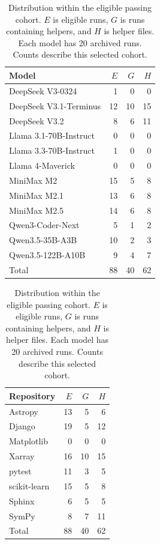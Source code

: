 \documentclass[10pt,conference]{IEEEtran}
\begin{document}
\begin{table}[t]
\centering
\caption{Distribution within the eligible passing cohort. $E$ is eligible runs, $G$ is runs containing helpers, and $H$ is helper files. Each model has 20 archived runs. Counts describe this selected cohort.}
\label{tab:population}
\begin{minipage}[t]{0.49\textwidth}
\centering
\begin{tabular}[t]{@{}lrrr@{}}
\toprule
Model & $E$ & $G$ & $H$ \\
\midrule
DeepSeek V3-0324 & 1 & 0 & 0 \\
DeepSeek V3.1-Terminus & 12 & 10 & 15 \\
DeepSeek V3.2 & 8 & 6 & 11 \\
Llama 3.1-70B-Instruct & 0 & 0 & 0 \\
Llama 3.3-70B-Instruct & 1 & 0 & 0 \\
Llama 4-Maverick & 0 & 0 & 0 \\
MiniMax M2 & 15 & 5 & 8 \\
MiniMax M2.1 & 13 & 6 & 8 \\
MiniMax M2.5 & 14 & 6 & 8 \\
Qwen3-Coder-Next & 5 & 1 & 2 \\
Qwen3.5-35B-A3B & 10 & 2 & 3 \\
Qwen3.5-122B-A10B & 9 & 4 & 7 \\
\midrule
Total & 88 & 40 & 62 \\
\bottomrule
\end{tabular}
\end{minipage}\hfill
\begin{minipage}[t]{0.49\textwidth}
\centering
\begin{tabular}[t]{@{}lrrr@{}}
\toprule
Repository & $E$ & $G$ & $H$ \\
\midrule
Astropy & 13 & 5 & 6 \\
Django & 19 & 5 & 12 \\
Matplotlib & 0 & 0 & 0 \\
Xarray & 16 & 10 & 15 \\
pytest & 11 & 3 & 5 \\
scikit-learn & 15 & 5 & 8 \\
Sphinx & 6 & 5 & 5 \\
SymPy & 8 & 7 & 11 \\
\midrule
Total & 88 & 40 & 62 \\
\bottomrule
\end{tabular}
\end{minipage}
\end{table}
\end{document}

